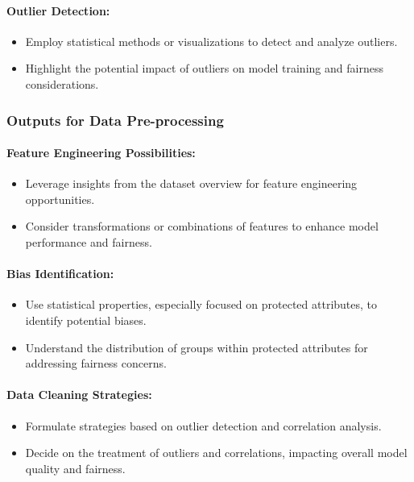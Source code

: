 \paragraph{Outlier Detection:}
\begin{itemize}
    \item Employ statistical methods or visualizations to detect and analyze outliers.
    \item Highlight the potential impact of outliers on model training and fairness considerations.
\end{itemize}

\subsubsection{Outputs for Data Pre-processing}

\paragraph{Feature Engineering Possibilities:}
\begin{itemize}
    \item Leverage insights from the dataset overview for feature engineering opportunities.
    \item Consider transformations or combinations of features to enhance model performance and fairness.
\end{itemize}

\paragraph{Bias Identification:}
\begin{itemize}
    \item Use statistical properties, especially focused on protected attributes, to identify potential biases.
    \item Understand the distribution of groups within protected attributes for addressing fairness concerns.
\end{itemize}

\paragraph{Data Cleaning Strategies:}
\begin{itemize}
    \item Formulate strategies based on outlier detection and correlation analysis.
    \item Decide on the treatment of outliers and correlations, impacting overall model quality and fairness.
\end{itemize}

